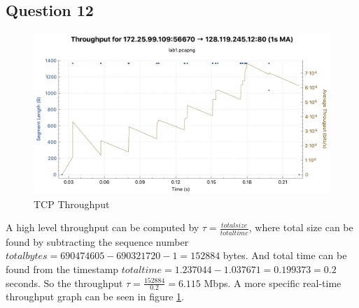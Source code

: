\documentclass[titlepage, paper=a4, fontsize=11pt]{scrartcl} %
\numberwithin{equation}{section} %
\numberwithin{figure}{section} %
\numberwithin{table}{section} %
\begin{document}
\subsection*{Question 12}
\begin{figure}[!ht]
    \centering
    \includegraphics[width=\textwidth]{images/lab1-q12.pdf}
    \caption{TCP Throughput}
    \label{fig:tcp-thru}
\end{figure}
A high level throughput can be computed by $\tau = \frac{total size}{total time}$, where total size can be found by subtracting the sequence number $total bytes = 690474605-690321720-1=152884$ bytes. And total time can be found from the timestamp $total time = 1.237044 - 1.037671 = 0.199373 = 0.2$ seconds. So the throughput $\tau = \frac{152884}{0.2}=6.115$ Mbps. A more specific real-time throughput graph can be seen in figure \ref{fig:tcp-thru}.
\end{document}
